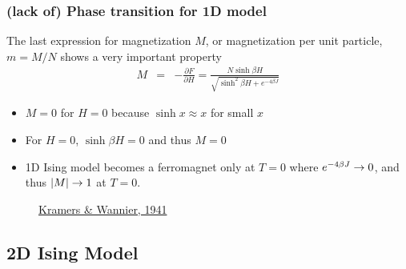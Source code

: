 \documentclass[hyperref={colorlinks=true}]{beamer}
\begin{document}

\begin{frame}%
  \frametitle{(lack of) Phase transition for 1D model}

  The last expression for magnetization $M$, or magnetization per unit particle, $m=M/N$ shows a very important property
  \begin{eqnarray}
           M &=& -\frac{\partial F}{\partial H} = \frac{N \sinh \beta H}{\sqrt{\sinh^2 \beta H + e^{-4 \beta J}}} 
  \end{eqnarray}
  \begin{itemize}
    \item $M=0$ for $H=0$ because $\sinh x \approx x$ for small $x$
    \item For $H=0$, $\sinh \beta H = 0$ and thus $M = 0$
    \item 1D Ising model becomes a ferromagnet only at $T =0$ where $e^{-4 \beta J} \rightarrow 0$, and thus $|M| \rightarrow 1$ at $T =0$.
  \end{itemize}
  
  \pause
  
  \begin{ucblock}{}
  \centering {} 
  \end{ucblock}
  \pause
  \begin{figure}
    \center 
    \href{https://journals.aps.org/pr/abstract/10.1103/PhysRev.60.252}{Kramers \& Wannier, 1941}
  \end{figure}
  
\end{frame}

\subsection[2D Ising Model]{2D Ising Model}

\end{document}
